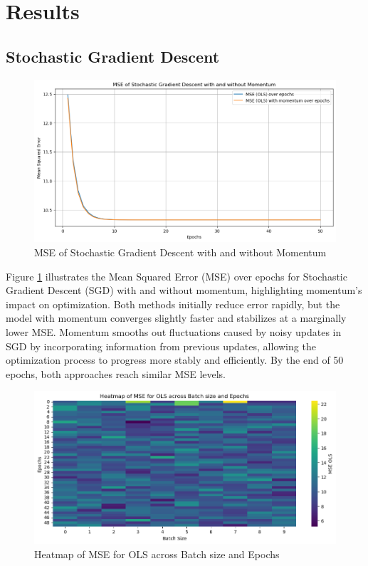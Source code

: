 \documentclass{article}
\newcommand{\0}{\mathbf{0}}
\newcommand{\1}{\mathbf{1}}
\begin{document}
\section{Results}

\subsection{Stochastic Gradient Descent}

\begin{figure}[h!]
    \centering
    \includegraphics[width=0.9\linewidth]{MSE_OLS_plot_momentum_no_momentum_TaskA.png}
    \caption{MSE of Stochastic Gradient Descent with and without Momentum}
    \label{MSE_OLS_plot_momentum_no_momentum}
\end{figure}


Figure \ref{MSE_OLS_plot_momentum_no_momentum} illustrates the Mean Squared Error (MSE) over epochs for Stochastic Gradient Descent (SGD) with and without momentum, highlighting momentum's impact on optimization. Both methods initially reduce error rapidly, but the model with momentum converges slightly faster and stabilizes at a marginally lower MSE. Momentum smooths out fluctuations caused by noisy updates in SGD by incorporating information from previous updates, allowing the optimization process to progress more stably and efficiently. By the end of 50 epochs, both approaches reach similar MSE levels.


\begin{figure}[h!]
    \centering
    \includegraphics[width=0.9\linewidth]{Epoch_batchsize_TaskA_1.png}
    \caption{Heatmap of MSE for OLS across Batch size and Epochs}
    \label{Epoch_batchsize_1}
\end{figure}
\end{document}
